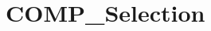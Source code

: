\hypertarget{group___c_o_m_p___selection}{\section{C\-O\-M\-P\-\_\-\-Selection}
\label{group___c_o_m_p___selection}
}
